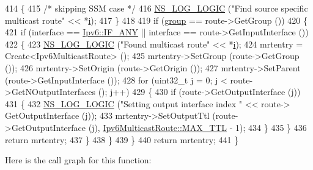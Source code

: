 \begin{DoxyCode}
414         \{
415           \textcolor{comment}{/* skipping SSM case */}
416           \hyperlink{group__logging_ga88acd260151caf2db9c0fc84997f45ce}{NS\_LOG\_LOGIC} (\textcolor{stringliteral}{"Find source specific multicast route"} << *\hyperlink{bernuolliDistribution_8m_a6f6ccfcf58b31cb6412107d9d5281426}{i});
417         \}
418 
419       \textcolor{keywordflow}{if} (\hyperlink{namespacevisualizer_1_1higcontainer_aa6ad2b76790275bfce7783429beaa23f}{group} == route->GetGroup ())
420         \{
421           \textcolor{keywordflow}{if} (interface == \hyperlink{classns3_1_1Ipv6_a1e55b17e6e1a4e1b439778543458bbe3}{Ipv6::IF\_ANY} || interface == route->GetInputInterface ())
422             \{
423               \hyperlink{group__logging_ga88acd260151caf2db9c0fc84997f45ce}{NS\_LOG\_LOGIC} (\textcolor{stringliteral}{"Found multicast route"} << *\hyperlink{bernuolliDistribution_8m_a6f6ccfcf58b31cb6412107d9d5281426}{i});
424               mrtentry = Create<Ipv6MulticastRoute> ();
425               mrtentry->SetGroup (route->GetGroup ());
426               mrtentry->SetOrigin (route->GetOrigin ());
427               mrtentry->SetParent (route->GetInputInterface ());
428               \textcolor{keywordflow}{for} (uint32\_t j = 0; j < route->GetNOutputInterfaces (); j++)
429                 \{
430                   \textcolor{keywordflow}{if} (route->GetOutputInterface (j))
431                     \{
432                       \hyperlink{group__logging_ga88acd260151caf2db9c0fc84997f45ce}{NS\_LOG\_LOGIC} (\textcolor{stringliteral}{"Setting output interface index "} << route->
      GetOutputInterface (j));
433                       mrtentry->SetOutputTtl (route->GetOutputInterface (j), 
      \hyperlink{classns3_1_1Ipv6MulticastRoute_a4e067c261e6c0abbeaaeb050f9b1727b}{Ipv6MulticastRoute::MAX\_TTL} - 1);
434                     \}
435                 \}
436               \textcolor{keywordflow}{return} mrtentry;
437             \}
438         \}
439     \}
440   \textcolor{keywordflow}{return} mrtentry;
441 \}
\end{DoxyCode}


Here is the call graph for this function\+:


